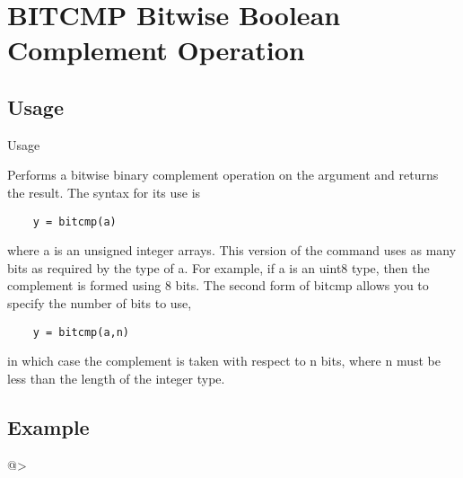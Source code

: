 \section{BITCMP Bitwise Boolean Complement Operation}

\subsection{Usage}

 Usage
 
 Performs a bitwise binary complement operation on the argument and
 returns the result.  The syntax for its use is
\begin{verbatim}
    y = bitcmp(a)
\end{verbatim}
 where a is an unsigned integer arrays.  This version of the command
 uses as many bits as required by the type of a.  For example, if 
 a is an uint8 type, then the complement is formed using 8 bits.
 The second form of bitcmp allows you to specify the number of bits
 to use, 
\begin{verbatim}
    y = bitcmp(a,n)
\end{verbatim}
 in which case the complement is taken with respect to n bits, where n must be 
 less than the length of the integer type.

\subsection{Example}

@>
